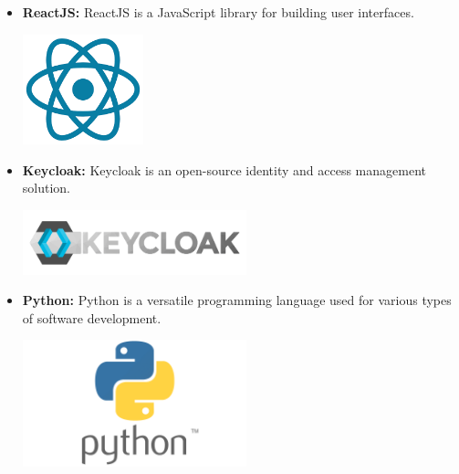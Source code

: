 \begin{itemize}
\begin{minipage}{\linewidth}
          \end{minipage}
    \item \textbf{ReactJS:} \newline ReactJS \cite{ReactJS} is a JavaScript library for building user interfaces. \newline \newline
          \begin{minipage}{\linewidth}
              \centering
              \includegraphics[width=3.5cm]{src/assets/logos/reactjs.png}
          \end{minipage}
    \item \textbf{Keycloak:} \newline  Keycloak \cite{Keycloak} is an open-source identity and access management solution. \newline \newline
          \begin{minipage}{\linewidth}
              \centering
              \includegraphics[width=6.5cm]{src/assets/logos/Keycloak-logo.png}
          \end{minipage}
    \item \textbf{Python:} \newline  Python \cite{Python} is a versatile programming language used for various types of software development. \newline \newline
          \begin{minipage}{\linewidth}
              \centering
              \includegraphics[width=6.5cm]{src/assets/logos/python.png}

\end{minipage}
\end{itemize}
